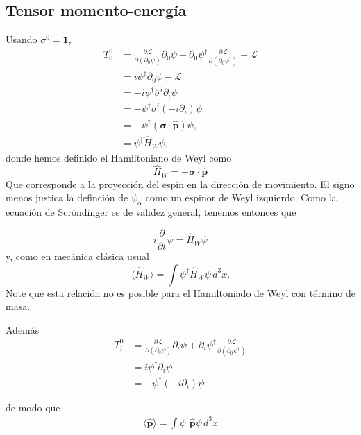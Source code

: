 \subsection{Tensor momento-energía}
\label{sec:tens-momento-energi}
\begin{frame}
Usando $\sigma^{0}=\mathbf{1}$,
\begin{align}
  T^0_0&=\frac{\partial\mathcal{L}}{\partial\left(\partial_0\psi\right)}\partial_0\psi+\partial_0\psi^\dagger\frac{\partial\mathcal{L}}{\partial\left(\partial_0\psi^\dagger\right)}-\mathcal{L}\nonumber\\
  &=i\psi^\dagger\partial_0\psi-\mathcal{L}\nonumber\\
  &=-i\psi^\dagger \overline{\sigma}^i\partial_i\psi\nonumber\\
  &=-\psi^\dagger \sigma^i \left( -i \partial_i\right)\psi\nonumber\\
  &=-\psi^\dagger(\boldsymbol{\sigma}\cdot\widehat{\mathbf{p}})\psi,\nonumber\\
  \label{eq:118qft}
  &=\psi^\dagger\hat{H}_{W} \psi,
\end{align}
donde hemos definido el Hamiltoniano de Weyl como
\begin{equation}
  \label{eq:denshal}
  \hat{H}_W= -\boldsymbol{\sigma}\cdot\widehat{\mathbf{p}}
\end{equation}
Que corresponde a la proyección del espín en la dirección de movimiento. El signo menos justica la definción de $\psi_{\alpha}$ como un espinor de Weyl izquierdo. Como la ecuación de Scröndinger es de validez general, tenemos entonces que

\begin{equation}
  i\frac{\partial}{\partial t}\psi=\hat{H}_W \psi
\end{equation}
y, como en mecánica clásica usual
\begin{equation}
  \label{eq:99qft}
  \langle\hat{H}_W\rangle=\int \psi^\dagger\hat{H}_W \psi\,d^3x.
\end{equation}
Note que esta relación no es posible para el Hamiltoniado de Weyl con término de masa.

Además
\begin{align}
    T^0_i&=\frac{\partial\mathcal{L}}{\partial\left(\partial_0\psi\right)}\partial_i\psi+\partial_i\psi^\dagger\frac{\partial\mathcal{L}}{\partial\left(\partial_0\psi^\dagger\right)}\nonumber\\
    &=i\psi^\dagger\partial_i\psi\nonumber\\
    &=-\psi^\dagger(-i\partial_i)\psi
\end{align}

de modo que
\begin{align}
\langle\hat{\mathbf{p}}\rangle=\int\psi^\dagger\hat{\mathbf{p}}\psi\,d^3 x
\end{align}
\end{frame}
